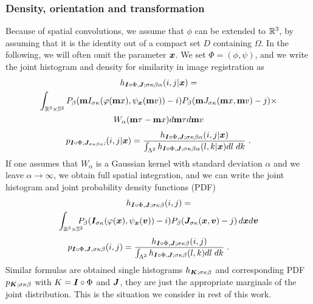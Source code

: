 \documentclass[twocolumn]{svjour3}
\begin{document}
\subsubsection{Density, orientation and transformation}
Because of spatial convolutions, we assume that $\phi$ can be extended to ${\mathbb R}^3$, by assuming that it is the identity out
of a compact set $D$ containing $\Omega$.
In the following, we will often omit the parameter $\boldsymbol{x}$. We set $\Phi = (\phi,\psi)$,
and we write the joint histogram and density for similarity in image registration as
\begin{multline}
h_{\boldsymbol{I}\circ\Phi,\boldsymbol{J};\sigma\kappa\beta\alpha}(i,j|\boldsymbol{x})=\\ 
                      \int_{\mathbb R^3 \times {\mathbb S}^2}P_\beta({\bf m} I_{\sigma\kappa}(\varphi({\bf m} x),\psi_{\boldsymbol{x}}({\bf m} v))-i)
                        P_\beta({\bf m} J_{\sigma\kappa}({\bf m} x,{\bf m} v)-j) \times\\
                      W_\alpha({\bf m} \tau-{\bf m} x)d{\bf m} \tau d{\bf m} v \label{eq:densityreg}
\end{multline}
\vspace{-5mm}
\begin{multline}
 p_{\boldsymbol{I}\circ\Phi,\boldsymbol{J}_{\sigma\kappa\beta\alpha};}(i,j|\boldsymbol{x})=\frac{h_{\boldsymbol{I}\circ\Phi,\boldsymbol{J};\sigma\kappa\beta\alpha}(i,j|\boldsymbol{x})}
                       {\int_{\Lambda^{2}} h_{\boldsymbol{I}\circ\Phi,\boldsymbol{J};\sigma\kappa\beta\alpha}(l,k|\boldsymbol{x})dl\;dk}\;.
\end{multline}
If one assumes that $W_\alpha$ is a Gaussian kernel with standard deviation $\alpha$ and we leave
$\alpha\rightarrow\infty$, we obtain full spatial integration, and we can write the joint histogram
and joint probability density functions (PDF)
\begin{multline}
\label{eq:histo_fullspatial}
	h_{\boldsymbol{I}\circ\Phi,\boldsymbol{J};\sigma\kappa\beta}(i, j)=\\
	\int_{{\mathbb R}^3\times{\mathbb S}^2}\!\!\!\!\!P_\beta(\boldsymbol{I}_{\sigma\kappa}(\varphi(\boldsymbol{x}),\psi_{\boldsymbol{x}}(\boldsymbol{v}))-i)
	P_\beta(\boldsymbol{J}_{\sigma\kappa}(\boldsymbol{x},\boldsymbol{v})-j)\,d\boldsymbol{x} d\boldsymbol{v}
\end{multline}
\vspace{-5mm}
\begin{equation}
	p_{\bsI\circ\Phi,\bsJ,\sigma\kappa\beta}(i,j) = \frac{h_{\bsI\circ\Phi,\bsJ;\sigma\kappa\beta}(i, j)}
	{\int_{\Lambda^2}h_{\bsI\circ\Phi,\bsJ;\sigma\kappa\beta}(l,k)dl\;dk}\;.~~~~~~~\hfil
\end{equation}
Similar formulas are obtained single histograms $h_{\boldsymbol{K};\sigma\kappa\beta}$ and corresponding 
PDF $p_{\boldsymbol{K};\sigma\kappa\beta}$ with $K = \boldsymbol{I}\circ\Phi$ and $\boldsymbol{J}$, 
they are just the appropriate marginals of the joint distribution.
This is the situation we consider in rest of this work.
\end{document}
